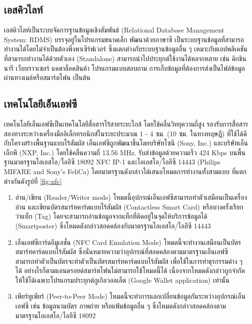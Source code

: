 \documentclass[12pt,a4paper]{article}
\begin{document}
\subsection{เอสคิวไลท์}
เอสคิวไลท์เป็นระบบจัดการฐานข้อมูลเชิงสัมพันธ์ (Relational Database Management System: RDMS) บรรจุอยู่ในโปรแกรมขนาดเล็ก พัฒนาด้วยภาษาซี เป็นระบบฐานข้อมูลที่สามารถทำงานได้โดยไม่จำเป็นต้องพึ่งพาเซิร์ฟเวอร์ ซึ่งแตกต่างกับระบบฐานข้อมูลอื่น ๆ เหมาะกับแอปพลิเคชันที่สามารถทำงานได้ด้วยตัวเอง (Standalone) สามารถนำไปประยุกต์ใช้งานได้หลากหลาย เช่น ดิกชินนารี เว็บบราวเซอร์ แคตาล็อคสินค้า โปรแกรมแบบสอบถาม การเก็บข้อมูลที่ต้องการส่งเป็นไฟล์ข้อมูลผ่านทางเมล์หรือสมาร์ตโฟน เป็นต้น

\subsection{เทคโนโลยีเอ็นเอฟซี}
เทคโนโลยีเอ็นเอฟซีเป็นเทคโนโลยีสื่อสารไร้สายระยะใกล้ โดยใช้คลื่นวิทยุความถี่สูง รองรับการสื่อสารสองทางระหว่างเครื่องมืออิเล็กทรอนิกส์ในระยะประมาณ 1 - 4 ซม. (10 ซม. ในทางทฤษฎี) ที่ใช้ได้ดีกับโครงสร้างพื้นฐานแบบไร้สัมผัส เอ็นเอฟซีถูกพัฒนาขึ้นโดยบริษัทโซนี (Sony, Inc.) และบริษัทเอ็นเอ็กพี (NXP, Inc.) โดยใช้คลื่นความถี่ 13.56 MHz. รับส่งข้อมูลด้วยความเร็ว 424 Kbps บนพื้นฐานมาตรฐานไอเอสโอ/ไออีซี 18092 NFC IP-1 \cite{itm:prp-rfid} และไอเอสโอ/ไออีซี 14443 \cite{itm:cicc} (Philips MIFARE and Sony’s FeliCa) โดยมาตรฐานดังกล่าวได้เสนอโหมดการทำงานทั้งสามแบบ \cite{itm:IDA-Pay} ที่แตกต่างกันดังรูปที่ \ref{fig:nfc}

\begin{enumerate}
\item อ่าน/เขียน (Reader/Writer mode) โหมดนี้อุปกรณ์เอ็นเอฟซีสามารถทำตัวเสมือนเป็นเครื่องอ่าน และเขียนบัตรสมาร์ทคาร์ดแบบไร้สัมผัส (Contactless Smart Card) หรือบางครั้งเรียกว่าแท็ก (Tag) โดยจะสามารถอ่านข้อมูลจากแท็กที่ติดอยู่ในจุดให้บริการข้อมูลได้ (Smartposter) ซึ่งโหมดดังกล่าวสอดคล้องกับมาตรฐานไอเอสโอ/ไออีซี 14443

\item เอ็นเอฟซีการ์ดอีมูเลชั่น (NFC Card Emulation Mode) โหมดนี้จะทำงานเสมือนเป็นบัตรสมาร์ทคาร์ดแบบไร้สัมผัส ซึ่งนั่นหมายความว่าอุปกรณ์ที่สอดคล้องตามมาตรฐานเอ็นเอฟซี สามารถทำตัวเป็นบัตรจะทำตัวเป็นบัตรสมาร์ทคาร์ดแบบไร้สัมผัส เพื่อใช้ในการทำธุรกรรมต่าง ๆ ได้ อย่างไรก็ตามแอนดรอยด์สมาร์ตโฟนไม่สามารถใช้โหมดนี้ได้ \cite{itm:IDA-Pay} เนื่องจากโหมดดังกล่าวถูกจำกัดให้ใช้ได้เฉพาะโปรแกรมประยุกต์กูเกิลวอลเล็ต (Google Wallet application) เท่านั้น 

\item เพียร์ทูเพียร์ (Peer-to-Peer Mode) โหมดนี้จะทำการแลกเปลี่ยนข้อมูลกันระหว่างอุปกรณ์เอ็นเอฟซี เช่น ข้อมูลนามบัตร ภาพถ่าย หรือแฟ้มข้อมูลอื่น ๆ ซึ่งโหมดดังกล่าวสอดคล้องตามมาตรฐานไอเอสโอ/ไออีซี 18092
\end{enumerate}
\end{document}
